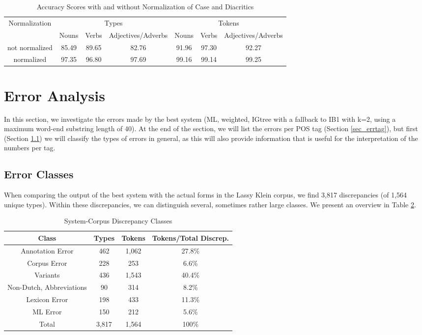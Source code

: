 \documentclass[a4paper,10pt,twoside]{article}
\begin{document}
\begin{table}[tbh]
\begin{center}
\begin{tabular}{|c|ccc|ccc|}
\hline
Normalization & \multicolumn{3}{|c|}{Types} & \multicolumn{3}{|c|}{Tokens} \\
& Nouns & Verbs & Adjectives/Adverbs & Nouns & Verbs & Adjectives/Adverbs \\ \hline
not normalized & 85.49 & 89.65 & 82.76 &  91.96 & 97.30 & 92.27 \\
normalized  & 97.35 & 96.80 & 97.69 &  99.16 & 99.14 & 99.25 \\
\hline
\end{tabular}
\caption{Accuracy Scores with and without Normalization of Case and Diacritics}
\label{tab_results_normal}
\end{center}
\end{table}



\section{Error Analysis}
\label{sec_errana}
In this section, we investigate the errors made by the best system (ML, weighted, IGtree with a fallback to IB1 with k=2, using a maximum word-end substring length of 40). At the end of the section, we will list the errors per POS tag (Section \ref{sec_errtag}), but first (Section \ref{sec_errtype}) we will classify the types of errors in general, as this will also provide information that is useful for the interpretation of  the numbers per tag. 

\subsection{Error Classes}
\label{sec_errtype}
When comparing the output of the best system with the actual forms in the Lassy Klein corpus, we find 3,817 discrepancies (of 1,564 unique types). Within these discrepancies, we can distinguish several, sometimes rather large classes. We present an overview in Table \ref{tab_errtypes}.


\begin{table}[tbh]
\begin{center}
\begin{tabular}{|c|ccc|}
\hline

Class & Types & Tokens & Tokens/Total Discrep. \\
\hline
Annotation Error & 462 & 1,062 & 27.8\% \\
Corpus Error & 228 & 253 & 6.6\% \\
Variants & 436 & 1,543 & 40.4\%\\
\hline
Non-Dutch, Abbreviations & 90 & 314 & 8.2\%\\
\hline
Lexicon Error & 198 & 433 & 11.3\% \\
ML Error & 150 & 212 & 5.6\% \\
\hline
Total &  3,817 & 1,564 & 100\% \\
\hline
\end{tabular}
\caption{System-Corpus Discrepancy Classes}
\label{tab_errtypes}
\end{center}
\end{table}
\end{document}
